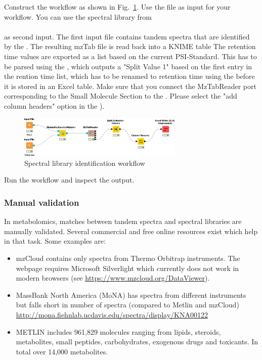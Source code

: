 \begin{task}
Construct the workflow as shown in Fig.~\ref{fig:speclib}.
Use the file  as input for your workflow.  You can use the spectral library from \\
\\ as second input. 
The first input file contains tandem spectra that are identified by the . The resulting mzTab file is read back into a KNIME table
The retention time values are exported as a list based on the current PSI-Standard. This has to be parsed using the , which outputs a "Split Value 1" based on the first entry in the rention time list, which has to be renamed to retention time using the  before it is stored in an Excel table. Make sure that you connect the MzTabReader port corresponding to the Small Molecule Section to the . Please select the "add column headers" option in the ).

\end{task}

\begin{figure}[htbp]
  \centering
  \includegraphics[width=0.7\textwidth]{graphics/metabo/speclib.png}
  \caption{Spectral library identification workflow}
  \label{fig:speclib}
\end{figure}

Run the workflow and inspect the output.

\subsubsection{Manual validation}

In metabolomics, matches between tandem spectra and spectral libraries are manually validated. Several commercial and free online resources exist which help in that task. Some examples are:

\begin{itemize}
\item mzCloud contains only spectra from Thermo Orbitrap instruments. The webpage requires Microsoft Silverlight which currently does not work in modern browsers (see \url{https://www.mzcloud.org/DataViewer}).
\item MassBank North America (MoNA) has spectra from different instruments but falls short in number of spectra (compared to Metlin and mzCloud) \url{http://mona.fiehnlab.ucdavis.edu/spectra/display/KNA00122}
\item METLIN includes 961,829 molecules ranging from lipids, steroids, metabolites, small peptides, carbohydrates, exogenous drugs and toxicants. In total over 14,000 metabolites.
\end{itemize}

